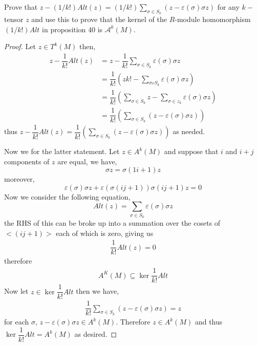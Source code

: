 \documentclass[11pt]{article}
\newenvironment{problem}[2][Problem\!]{\begin{tcolorbox}\begin{trivlist}
\item[\hskip \labelsep {\bfseries #1}\hskip \labelsep {\bfseries #2}]}{\end{trivlist}\end{tcolorbox}}
\renewcommand{\epsilon}{\varepsilon}
\newcommand{\lrp}[1]{\left(#1\right)}
\begin{document}
\begin{problem} {11.5.10}
    Prove that $z-(1/k!)Alt(z) = (1/k!)\sum_{\sigma \in S_k}(z -\epsilon(\sigma)\sigma z)$ for any $k-$tensor $z$ and use this to prove that the kernel of the $R$-module homomorphism $(1/k!)Alt$ in proposition 40 is $\mathcal{A}^{k}(M)$.
\end{problem}
\begin{proof}
    Let $z \in T^{k}(M)$ then,
    \begin{align*}
        z - \dfrac{1}{k!}Alt(z) &= z - \dfrac{1}{k!}\sum_{\sigma\in S_k}\epsilon (\sigma )\sigma z   \\
        &= \dfrac{1}{k!}\lrp{zk! - \sum_{\sigma \epsilon S_k} \epsilon (\sigma)\sigma z} \\
        &= \dfrac{1}{k!}\lrp{\sum_{\sigma \in S_k}z - \sum_{\sigma \in z_k} \epsilon (\sigma) \sigma z} \\
        &= \dfrac{1}{k!}\lrp{\sum_{\sigma \in S_k}(z - \epsilon(\sigma) \sigma z)}
    \end{align*}
    thus $z -\dfrac{1}{k!}Alt(z) = \dfrac{1}{k!}\lrp{\sum_{\sigma \in S_k}(z - \epsilon(\sigma)\sigma z)}$ as needed. 

    Now we for the latter statement. Let $z \in A^{k}(M)$ and suppose that $i$ and $i+j$ components of $z$ are equal, we have,
    \[\sigma z = \sigma(1 i + 1)z\]
    moreover,
    \[\epsilon(\sigma)\sigma z + \epsilon(\sigma(ij + 1))\sigma(ij+1)z = 0\]
    Now we consider the following equation,
    \[Alt(z) = \sum_{\sigma \in S_k}\epsilon(\sigma)\sigma z\]
    the RHS of this can be broke up into a summation over the cosets of $<(ij + 1)>$ each of which is zero, giving us
    \begin{align*}
        \dfrac{1}{k!}Alt(z) = 0 
    \end{align*}
    therefore 
    \begin{align*}
        A^{K}(M) \subseteq \ker \dfrac{1}{k!}Alt
    \end{align*}
    Now let $z \in \ker \dfrac{1}{k!} Alt$ then we have,
    \begin{align*}
        \dfrac{1}{k!} \sum_{\sigma \in S_k}(z - \epsilon(\sigma)\sigma z) = z
    \end{align*}
    for each $\sigma$, $z -\epsilon(\sigma)\sigma z \in A^{k}(M)$. Therefore $z \in A^{k}(M)$ and thus $\ker\dfrac{1}{k!} Alt = A^{k}(M)$ as desired. 
\end{proof}

\vspace*{15pt}
\end{document}
